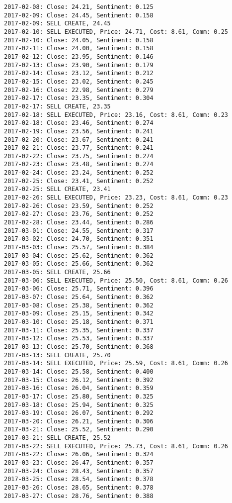 \documentclass[11pt]{article}
\begin{document}
\begin{Verbatim}[commandchars=\\\{\}]
2017-02-08: Close: 24.21, Sentiment: 0.125
2017-02-09: Close: 24.45, Sentiment: 0.158
2017-02-09: SELL CREATE, 24.45
2017-02-10: SELL EXECUTED, Price: 24.71, Cost: 8.61, Comm: 0.25
2017-02-10: Close: 24.05, Sentiment: 0.158
2017-02-11: Close: 24.00, Sentiment: 0.158
2017-02-12: Close: 23.95, Sentiment: 0.146
2017-02-13: Close: 23.90, Sentiment: 0.179
2017-02-14: Close: 23.12, Sentiment: 0.212
2017-02-15: Close: 23.02, Sentiment: 0.245
2017-02-16: Close: 22.98, Sentiment: 0.279
2017-02-17: Close: 23.35, Sentiment: 0.304
2017-02-17: SELL CREATE, 23.35
2017-02-18: SELL EXECUTED, Price: 23.16, Cost: 8.61, Comm: 0.23
2017-02-18: Close: 23.46, Sentiment: 0.274
2017-02-19: Close: 23.56, Sentiment: 0.241
2017-02-20: Close: 23.67, Sentiment: 0.241
2017-02-21: Close: 23.77, Sentiment: 0.241
2017-02-22: Close: 23.75, Sentiment: 0.274
2017-02-23: Close: 23.48, Sentiment: 0.274
2017-02-24: Close: 23.24, Sentiment: 0.252
2017-02-25: Close: 23.41, Sentiment: 0.252
2017-02-25: SELL CREATE, 23.41
2017-02-26: SELL EXECUTED, Price: 23.23, Cost: 8.61, Comm: 0.23
2017-02-26: Close: 23.59, Sentiment: 0.252
2017-02-27: Close: 23.76, Sentiment: 0.252
2017-02-28: Close: 23.44, Sentiment: 0.286
2017-03-01: Close: 24.55, Sentiment: 0.317
2017-03-02: Close: 24.70, Sentiment: 0.351
2017-03-03: Close: 25.57, Sentiment: 0.384
2017-03-04: Close: 25.62, Sentiment: 0.362
2017-03-05: Close: 25.66, Sentiment: 0.362
2017-03-05: SELL CREATE, 25.66
2017-03-06: SELL EXECUTED, Price: 25.50, Cost: 8.61, Comm: 0.26
2017-03-06: Close: 25.71, Sentiment: 0.396
2017-03-07: Close: 25.64, Sentiment: 0.362
2017-03-08: Close: 25.38, Sentiment: 0.362
2017-03-09: Close: 25.15, Sentiment: 0.342
2017-03-10: Close: 25.18, Sentiment: 0.371
2017-03-11: Close: 25.35, Sentiment: 0.337
2017-03-12: Close: 25.53, Sentiment: 0.337
2017-03-13: Close: 25.70, Sentiment: 0.368
2017-03-13: SELL CREATE, 25.70
2017-03-14: SELL EXECUTED, Price: 25.59, Cost: 8.61, Comm: 0.26
2017-03-14: Close: 25.58, Sentiment: 0.400
2017-03-15: Close: 26.12, Sentiment: 0.392
2017-03-16: Close: 26.04, Sentiment: 0.359
2017-03-17: Close: 25.80, Sentiment: 0.325
2017-03-18: Close: 25.94, Sentiment: 0.325
2017-03-19: Close: 26.07, Sentiment: 0.292
2017-03-20: Close: 26.21, Sentiment: 0.306
2017-03-21: Close: 25.52, Sentiment: 0.290
2017-03-21: SELL CREATE, 25.52
2017-03-22: SELL EXECUTED, Price: 25.73, Cost: 8.61, Comm: 0.26
2017-03-22: Close: 26.06, Sentiment: 0.324
2017-03-23: Close: 26.47, Sentiment: 0.357
2017-03-24: Close: 28.43, Sentiment: 0.357
2017-03-25: Close: 28.54, Sentiment: 0.378
2017-03-26: Close: 28.65, Sentiment: 0.378
2017-03-27: Close: 28.76, Sentiment: 0.388

\end{Verbatim}
\end{document}
